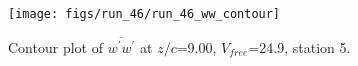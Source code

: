 \begin{figure}[H]
\centering
\texttt{[image: figs/run\_46/run\_46\_ww\_contour]}
\caption{Contour plot of $\overline{w^\prime w^\prime}$ at $z/c$=9.00, $V_{free}$=24.9, station 5.}
\end{figure}


